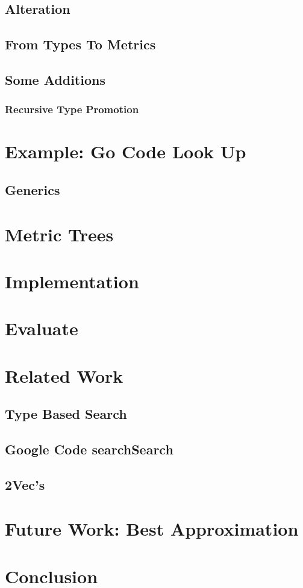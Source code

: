 \documentclass[12pt]{article}
\theoremstyle{plain}
\begin{document}
\subsection{Alteration}

\subsection{From Types To Metrics}

\subsection{Some Additions}
\subsubsection{Recursive Type Promotion}
\section{Example: Go Code Look Up}
\subsection{Generics}
\section{Metric Trees}

\section{Implementation}

\section{Evaluate}

\section{Related Work}
\subsection{Type Based Search}

\subsection{Google Code searchSearch}

\subsection{2Vec's}

\section{Future Work: Best Approximation}

\section{Conclusion}



\end{document}
